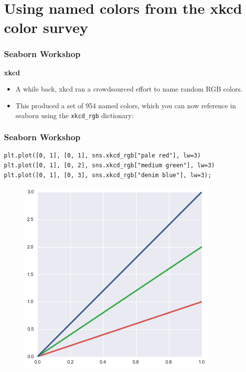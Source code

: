 \documentclass{beamer}
\begin{document}
\section{Using named colors from the xkcd color survey}
	
\begin{frame}[fragile]
	\frametitle{Seaborn Workshop}
	\large
\noindent \textbf{xkcd}
\begin{itemize}
\item A while back, xkcd ran a crowdsourced effort to name random RGB colors. 
\item This produced a set of 954 named colors, which you can now reference in seaborn using the \texttt{xkcd\_rgb} dictionary:
\end{itemize}

\end{frame}
\begin{frame}[fragile]
	\frametitle{Seaborn Workshop}
	\large
\begin{verbatim}
plt.plot([0, 1], [0, 1], sns.xkcd_rgb["pale red"], lw=3)
plt.plot([0, 1], [0, 2], sns.xkcd_rgb["medium green"], lw=3)
plt.plot([0, 1], [0, 3], sns.xkcd_rgb["denim blue"], lw=3);
\end{verbatim}

\begin{figure}
\centering
\includegraphics[width=0.55\linewidth]{images/color_palettes_21_0}
\end{figure}
\end{frame}
\end{document}
